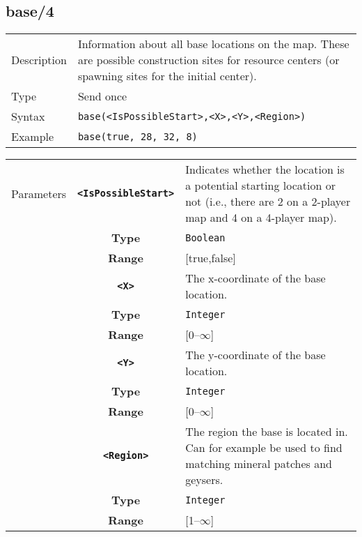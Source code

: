 \subsection{base/4}
\begin{tabularx}{\textwidth}{lX}
 Description & Information about all base locations on the map. These are possible construction sites for resource centers (or spawning sites for the initial center). \\
 Type & Send once \\
 Syntax & \verb|base(<IsPossibleStart>,<X>,<Y>,<Region>)| \\
 Example & \verb|base(true, 28, 32, 8)| \\
 \end{tabularx}
 \begin{tabularx}{\textwidth}{l | c | p{8cm}|}
 \cline{2-3}
 Parameters & \textbf{\verb|<IsPossibleStart>|} & Indicates whether the location is a potential starting location or not (i.e., there are 2 on a 2-player map and 4 on a 4-player map). \\
            & \textbf{Type} & \verb|Boolean| \\
            & \textbf{Range} & [true,false] \\
            \cline{2-3}
 			& \textbf{\verb|<X>|} & The x-coordinate of the base location.\\
            & \textbf{Type} & \verb|Integer| \\
            & \textbf{Range} & [0--$\infty$] \\
            \cline{2-3}
            & \textbf{\verb|<Y>|} & The y-coordinate of the base location.\\
            & \textbf{Type} & \verb|Integer| \\
            & \textbf{Range} & [0--$\infty$] \\
            \cline{2-3}
            & \textbf{\verb|<Region>|} & The region the base is located in. Can for example be used to find matching mineral patches and geysers. \\
            & \textbf{Type} & \verb|Integer| \\
            & \textbf{Range} & [1--$\infty$] \\
            \cline{2-3}
\end{tabularx}

